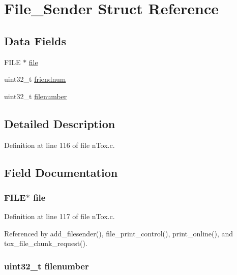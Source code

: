 \hypertarget{struct_file___sender}{\section{File\+\_\+\+Sender Struct Reference}
\label{struct_file___sender}
}
\subsection*{Data Fields}
\begin{DoxyCompactItemize}
\item 
F\+I\+L\+E $\ast$ \hyperlink{struct_file___sender_a702945180aa732857b380a007a7e2a21}{file}
\item 
uint32\+\_\+t \hyperlink{struct_file___sender_af02b3246ba69ea99fddd081f6e95598f}{friendnum}
\item 
uint32\+\_\+t \hyperlink{struct_file___sender_a32e4dffe2d73a1eeddb1bc8ce5511367}{filenumber}
\end{DoxyCompactItemize}


\subsection{Detailed Description}


Definition at line 116 of file n\+Tox.\+c.



\subsection{Field Documentation}
\hypertarget{struct_file___sender_a702945180aa732857b380a007a7e2a21}{
\subsubsection[{file}]{\setlength{\rightskip}{0pt plus 5cm}F\+I\+L\+E$\ast$ file}}\label{struct_file___sender_a702945180aa732857b380a007a7e2a21}


Definition at line 117 of file n\+Tox.\+c.



Referenced by add\+\_\+filesender(), file\+\_\+print\+\_\+control(), print\+\_\+online(), and tox\+\_\+file\+\_\+chunk\+\_\+request().

\hypertarget{struct_file___sender_a32e4dffe2d73a1eeddb1bc8ce5511367}{
\subsubsection[{filenumber}]{\setlength{\rightskip}{0pt plus 5cm}uint32\+\_\+t filenumber}}\label{struct_file___sender_a32e4dffe2d73a1eeddb1bc8ce5511367}


